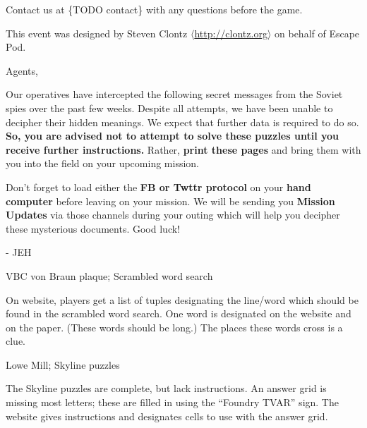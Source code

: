 \documentclass{puzzlehunt}
\begin{document}

Contact us at \{TODO contact\} with any questions before the game.

\vfill

{\footnotesize This event was designed by Steven Clontz
\(\langle\)\url{http://clontz.org}\(\rangle\) on behalf of Escape Pod.}



\noindent Agents,

Our operatives have intercepted the following secret messages from the
Soviet spies over the past few weeks. Despite all attempts, we have been
unable to decipher their hidden meanings. We expect that further data
is required to do so.
\textbf{So, you are advised not to attempt to solve these puzzles until you
receive further instructions.} Rather, \textbf{print these pages} and
bring them with you into the field on your upcoming mission.

Don't forget to load either the \textbf{FB or Twttr protocol} on your
\textbf{hand computer} before leaving on your mission. We will be sending
you \textbf{Mission Updates} via those channels during your outing which
will help you decipher these mysterious documents. Good luck!

- JEH




  VBC von Braun plaque; Scrambled word search

  On website, players get a list of tuples designating the line/word
  which should be found in the scrambled word search. One word is designated
  on the website and on the paper. (These words should be long.)
  The places these words cross is a clue.


  Lowe Mill; Skyline puzzles

  The Skyline puzzles are complete, but lack instructions. An answer grid
  is missing most letters; these are filled in using the ``Foundry TVAR''
  sign. The website gives instructions and designates cells to use with the
  answer grid.


\end{document}

